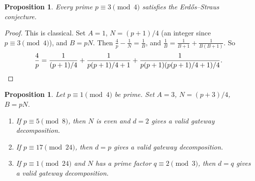 \documentclass[12pt]{amsart}
\newtheorem{proposition}[theorem]{Proposition}
\theoremstyle{definition}
\theoremstyle{remark}
\begin{document}
\begin{proposition}\label{prop:3mod4}
Every prime $p \equiv 3 \pmod{4}$ satisfies the Erd\H{o}s--Straus conjecture.
\end{proposition}

\begin{proof}
This is classical. Set $A = 1$, $N = (p+1)/4$ (an integer since $p \equiv 3 \pmod 4$),
and $B = pN$. Then $\frac{4}{p} - \frac{1}{N} = \frac{1}{B}$,
and $\frac{1}{B} = \frac{1}{B+1} + \frac{1}{B(B+1)}$. So
\[
  \frac{4}{p} = \frac{1}{(p+1)/4} + \frac{1}{p(p+1)/4 + 1}
              + \frac{1}{p(p+1)(p(p+1)/4 + 1)/4}. \qedhere
\]
\end{proof}

\begin{proposition}\label{prop:mod3}
Let $p \equiv 1 \pmod{4}$ be prime. Set $A = 3$, $N = (p+3)/4$, $B = pN$.
\begin{enumerate}[label=\textup{(\alph*)}]
  \item\label{mod3:even}
    If $p \equiv 5 \pmod{8}$, then $N$ is even and $d = 2$ gives a valid
    gateway decomposition.
  \item\label{mod3:p17}
    If $p \equiv 17 \pmod{24}$, then $d = p$ gives a valid gateway
    decomposition.
  \item\label{mod3:caseA}
    If $p \equiv 1 \pmod{24}$ and $N$ has a prime factor $q \equiv 2 \pmod{3}$,
    then $d = q$ gives a valid gateway decomposition.
\end{enumerate}
\end{proposition}
\end{document}

